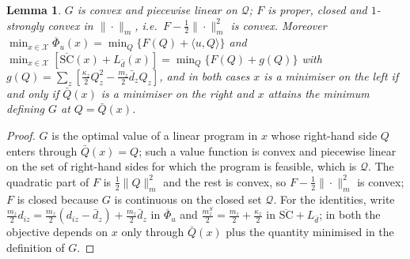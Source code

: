 \documentclass[preprint,12pt]{elsarticle}
\newtheorem{lemma}[theorem]{Lemma}
\theoremstyle{definition}
\theoremstyle{remark}
\newcommand{\ip}[2]{\langle #1,#2\rangle}
\newcommand{\cQ}{\mathcal{Q}}
\newcommand{\cX}{\mathcal{X}}
\begin{document}
\begin{lemma}\label{lem:F}
$G$ is convex and piecewise linear on $\cQ$; $F$ is proper, closed and $1$-strongly convex in $\|\cdot\|_m$, i.e.\ $F-\tfrac12\|\cdot\|_m^2$ is convex. Moreover $\min_{x\in\cX}\overline\Phi_u(x)=\min_Q\{F(Q)+\ip uQ\}$ and $\min_{x\in\cX}[\overline{\mathrm{SC}}(x)+L_{\bar d}(x)]=\min_Q\{F(Q)+g(Q)\}$ with $g(Q)=\sum_z[\tfrac{\kappa_z}{2}Q_z^2-\tfrac{m_z}{2}\bar d_zQ_z]$, and in both cases $x$ is a minimiser on the left if and only if $\bar Q(x)$ is a minimiser on the right and $x$ attains the minimum defining $G$ at $Q=\bar Q(x)$.
\end{lemma}
\begin{proof}
$G$ is the optimal value of a linear program in $x$ whose right-hand side $Q$ enters through $\bar Q(x)=Q$; such a value function is convex and piecewise linear on the set of right-hand sides for which the program is feasible, which is $\cQ$. The quadratic part of $F$ is $\tfrac12\|Q\|_m^2$ and the rest is convex, so $F-\tfrac12\|\cdot\|_m^2$ is convex; $F$ is closed because $G$ is continuous on the closed set $\cQ$. For the identities, write $\tfrac{m_z}{2}d_{iz}=\tfrac{m_z}{2}(d_{iz}-\bar d_z)+\tfrac{m_z}{2}\bar d_z$ in $\overline\Phi_u$ and $\tfrac{m^S_z}{2}=\tfrac{m_z}{2}+\tfrac{\kappa_z}{2}$ in $\overline{\mathrm{SC}}+L_{\bar d}$; in both the objective depends on $x$ only through $\bar Q(x)$ plus the quantity minimised in the definition of $G$.
\end{proof}
\end{document}
